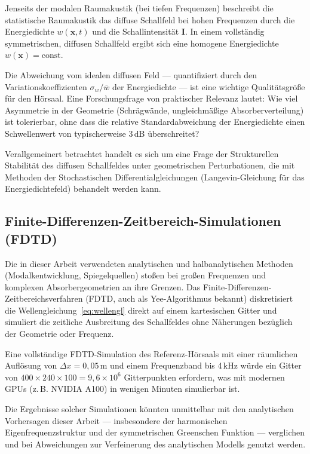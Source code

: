 ﻿\documentclass[12pt, a4paper]{article}
\theoremstyle{definition}
\theoremstyle{remark}
\begin{document}
Jenseits der modalen Raumakustik (bei tiefen Frequenzen) beschreibt die
statistische Raumakustik das diffuse Schallfeld bei hohen Frequenzen durch
die Energiedichte $w(\mathbf{x},t)$ und die Schallintensität $\mathbf{I}$.
In einem vollständig symmetrischen, diffusen Schallfeld ergibt sich eine
homogene Energiedichte $w(\mathbf{x}) = \mathrm{const.}$

Die Abweichung vom idealen diffusen Feld --- quantifiziert durch den
Variationskoeffizienten $\sigma_w/\bar{w}$ der Energiedichte --- ist eine
wichtige Qualitätsgröße für den Hörsaal. Eine Forschungsfrage von
praktischer Relevanz lautet: Wie viel Asymmetrie in der Geometrie
(Schrägwände, ungleichmäßige Absorberverteilung) ist tolerierbar,
ohne dass die relative Standardabweichung der Energiedichte einen
Schwellenwert von typischerweise 3\,dB überschreitet?

Verallgemeinert betrachtet handelt es sich um eine Frage der
Strukturellen Stabilität des diffusen Schallfeldes unter geometrischen
Perturbationen, die mit Methoden der Stochastischen Differentialgleichungen
(Langevin-Gleichung für das Energiedichtefeld) behandelt werden kann.

\subsection{Finite-Differenzen-Zeitbereich-Simulationen (FDTD)}

Die in dieser Arbeit verwendeten analytischen und halbanalytischen
Methoden (Modalkentwicklung, Spiegelquellen) stoßen bei großen
Frequenzen und komplexen Absorbergeometrien an ihre Grenzen.
Das Finite-Differenzen-Zeitbereichsverfahren (FDTD, auch als
Yee-Algorithmus bekannt) diskretisiert die Wellengleichung~\eqref{eq:wellengl}
direkt auf einem kartesischen Gitter und simuliert die zeitliche Ausbreitung
des Schallfeldes ohne Näherungen bezüglich der Geometrie oder Frequenz.

Eine vollständige FDTD-Simulation des Referenz-Hörsaals mit einer räumlichen
Auflösung von $\Delta x = 0{,}05\,\mathrm{m}$ und einem Frequenzband bis
4\,kHz würde ein Gitter von $400 \times 240 \times 100 = 9{,}6 \times 10^6$
Gitterpunkten erfordern, was mit modernen GPUs (z.\,B. NVIDIA A100)
in wenigen Minuten simulierbar ist.

Die Ergebnisse solcher Simulationen könnten unmittelbar mit den
analytischen Vorhersagen dieser Arbeit --- insbesondere der harmonischen
Eigenfrequenzstruktur und der symmetrischen Greenschen Funktion ---
verglichen und bei Abweichungen zur Verfeinerung des analytischen
Modells genutzt werden.
\end{document}
